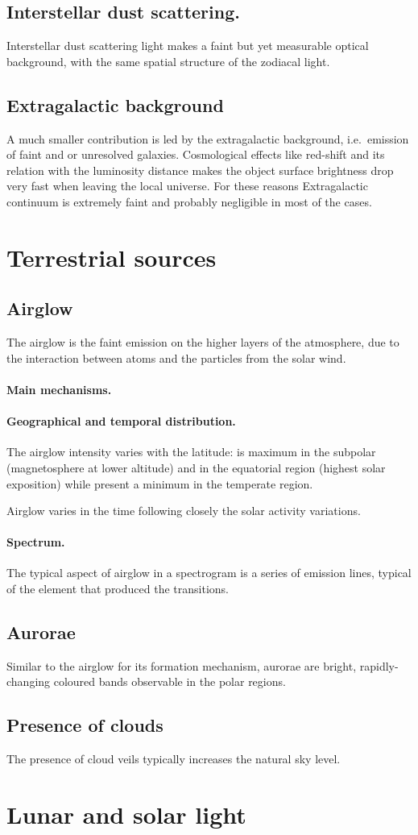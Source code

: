 \documentclass{book}
\begin{document}
\subsection{Interstellar dust scattering.}
Interstellar dust scattering light makes a faint but yet measurable optical background, with the same spatial structure of the zodiacal light.

\subsection{Extragalactic background}
A much smaller contribution is led by the extragalactic background, i.e.\ emission of faint and or unresolved galaxies. Cosmological effects like red-shift and its relation with the luminosity distance makes the object surface brightness drop very fast when leaving the local universe. For these reasons Extragalactic continuum is extremely faint and probably negligible in most of the cases.

\section{Terrestrial sources}

\subsection{Airglow}
The airglow is the faint emission on the higher layers of the atmosphere, due to the interaction between atoms and the particles from the solar wind.

\paragraph{Main mechanisms.}

\paragraph{Geographical and temporal distribution.} The airglow intensity varies with the latitude: is maximum in the subpolar (magnetosphere at lower altitude) and in the equatorial region (highest solar exposition) while present a minimum in the temperate region.

Airglow varies in the time following closely the solar activity variations.

\paragraph{Spectrum.} The typical aspect of airglow in a spectrogram is a series of emission lines, typical of the element that produced the transitions.

\subsection{Aurorae}
Similar to the airglow for its formation mechanism, aurorae are bright, rapidly-changing coloured bands observable in the polar regions.

\subsection{Presence of clouds}
The presence of cloud veils typically increases the natural sky level.

\section{Lunar and solar light}
\end{document}
